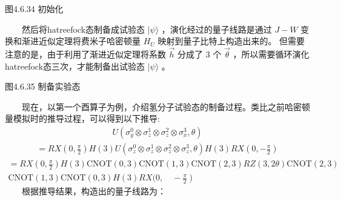\documentclass[a4paper,11pt,english]{sphinxmanual}
\begin{document}

\begin{center}图4.6.34 初始化
\end{center}
\sphinxAtStartPar
  然后将hatree\sphinxhyphen{}fock态制备成试验态  \(|\psi\rangle\) ，演化经过的量子线路是通过  \(J-W\) 变换和渐进近似定理将费米子哈密顿量 \(H_U\) 映射到量子比特上构造出来的。 但需要注意的是，由于利用了渐进近似定理将系数 \(\vec{h}\) 分成了 3 个 \(\vec{\theta}\) ，所以需要循环演化hatree\sphinxhyphen{}fock态三次，才能制备出试验态 \(|\psi\rangle\) 。


\begin{center}图4.6.35 制备实验态
\end{center}
\sphinxAtStartPar
  现在，以第一个酉算子为例，介绍氢分子试验态的制备过程。类比之前哈密顿量模拟时的推导过程，可以得到以下推导:
\begin{equation*}
\begin{split}U\left(\sigma_{y}^{0} \otimes \sigma_{z}^{1} \otimes \sigma_{z}^{2} \otimes \sigma_{x}^{3}, \theta\right)\end{split}
\end{equation*}\begin{equation*}
\begin{split}=R X\left(0, \frac{\pi}{2}\right) H(3) U\left(\sigma_{z}^{0} \otimes \sigma_{z}^{1} \otimes \sigma_{z}^{2} \otimes \sigma_{z}^{3}, \theta\right) H(3) R X\left(0,-\frac{\pi}{2}\right)\end{split}
\end{equation*}\begin{equation*}
\begin{split}=R X\left(0, \frac{\pi}{2}\right) H(3) \text{CNOT}(0,3) \text{CNOT}(1,3) \text{CNOT}(2,3) R Z(3,2 \theta) \text{CNOT}(2,3)\\ \text{CNOT}(1,3) \text{CNOT}(0,3) H(3) R X(0,\left.\quad-\frac{\pi}{2}\right)\end{split}
\end{equation*}
\sphinxAtStartPar
  根据推导结果，构造出的量子线路为：

\end{document}
